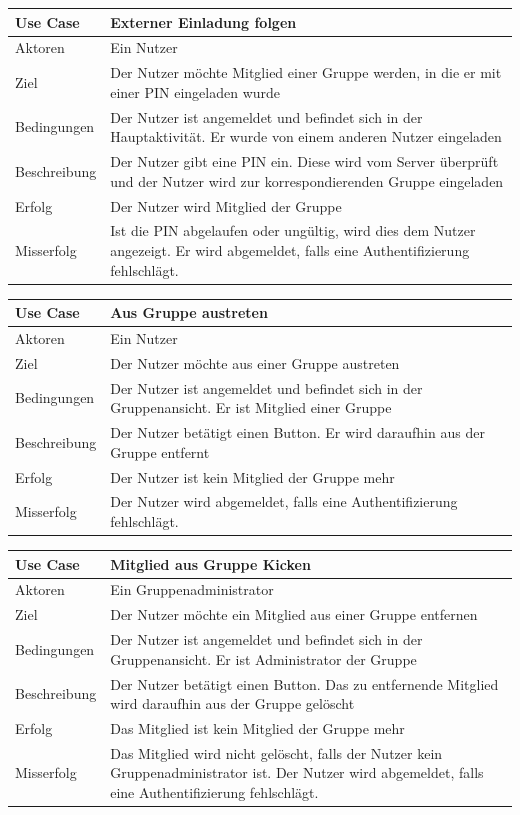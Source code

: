 \begin{tabular}{|p{}|p{}|}
\hline
\textbf{Use Case} & \textbf{Externer Einladung folgen} \\ \hline \hline
Aktoren &  Ein Nutzer \\ \hline
Ziel &  Der Nutzer möchte Mitglied einer Gruppe werden, in die er mit einer PIN eingeladen wurde \\ \hline
Bedingungen &  Der Nutzer ist angemeldet und befindet sich in der Hauptaktivität. Er wurde von einem anderen Nutzer eingeladen \\ \hline
Beschreibung & Der Nutzer gibt eine PIN ein. Diese wird vom Server überprüft und der Nutzer wird zur korrespondierenden Gruppe eingeladen \\ \hline
Erfolg & Der Nutzer wird Mitglied der Gruppe \\ \hline
Misserfolg & Ist die PIN abgelaufen oder ungültig, wird dies dem Nutzer angezeigt. Er wird abgemeldet, falls eine Authentifizierung fehlschlägt. \\ \hline
\hline \end{tabular}
\begin{tabular}{|p{}|p{}|}
\hline
\textbf{Use Case} & \textbf{Aus Gruppe austreten} \\ \hline \hline
Aktoren &  Ein Nutzer \\ \hline
Ziel &  Der Nutzer möchte aus einer Gruppe austreten\\ \hline
Bedingungen &  Der Nutzer ist angemeldet und befindet sich in der Gruppenansicht. Er ist Mitglied einer Gruppe \\ \hline
Beschreibung & Der Nutzer betätigt einen Button. Er wird daraufhin aus der Gruppe entfernt \\ \hline
Erfolg & Der Nutzer ist kein Mitglied der Gruppe mehr \\ \hline
Misserfolg & Der Nutzer wird abgemeldet, falls eine Authentifizierung fehlschlägt. \\ \hline
\hline \end{tabular}
\begin{tabular}{|p{}|p{}|}
\hline
\textbf{Use Case} & \textbf{Mitglied aus Gruppe Kicken} \\ \hline \hline
Aktoren &  Ein Gruppenadministrator \\ \hline
Ziel &  Der Nutzer möchte ein Mitglied aus einer Gruppe entfernen \\ \hline
Bedingungen &  Der Nutzer ist angemeldet und befindet sich in der Gruppenansicht. Er ist Administrator der Gruppe \\ \hline
Beschreibung & Der Nutzer betätigt einen Button. Das zu entfernende Mitglied wird daraufhin aus der Gruppe gelöscht \\ \hline
Erfolg & Das Mitglied ist kein Mitglied der Gruppe mehr \\ \hline
Misserfolg & Das Mitglied wird nicht gelöscht, falls der Nutzer kein Gruppenadministrator ist. Der Nutzer wird abgemeldet, falls eine Authentifizierung fehlschlägt. \\ \hline
\hline \end{tabular}
